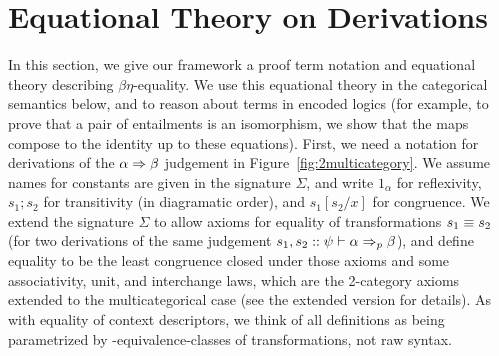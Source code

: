 \section{Equational Theory on Derivations}
\label{sec:equational}

In this section, we give our framework a proof term notation and
equational theory describing $\beta\eta$-equality.  We use this
equational theory in the categorical semantics below, and to reason
about terms in encoded logics (for example, to prove that a pair of
entailments is an isomorphism, we show that the maps compose to the
identity up to these equations).  First, we need a notation for
derivations of the $\alpha \Rightarrow \beta$ judgement in
Figure~\ref{fig:2multicategory}.  We assume names for constants are
given in the signature $\Sigma$, and write $1_\alpha$ for reflexivity,
$s_1;s_2$ for transitivity (in diagramatic order), and $s_1[s_2/x]$ for
congruence.  We extend the signature $\Sigma$ to allow axioms for
equality of transformations $s_1 \equiv s_2$ (for two derivations of the
same judgement $s_1,s_2 :: \psi \vdash \alpha \Rightarrow_{p} \beta$), and define
equality to be the least congruence closed under those axioms and some
associativity, unit, and interchange laws, which are the 2-category
axioms extended to the multicategorical case (see the extended version
for details).  As with equality of context descriptors, we think of all
definitions as being parametrized by \deq-equivalence-classes of
transformations, not raw syntax.

